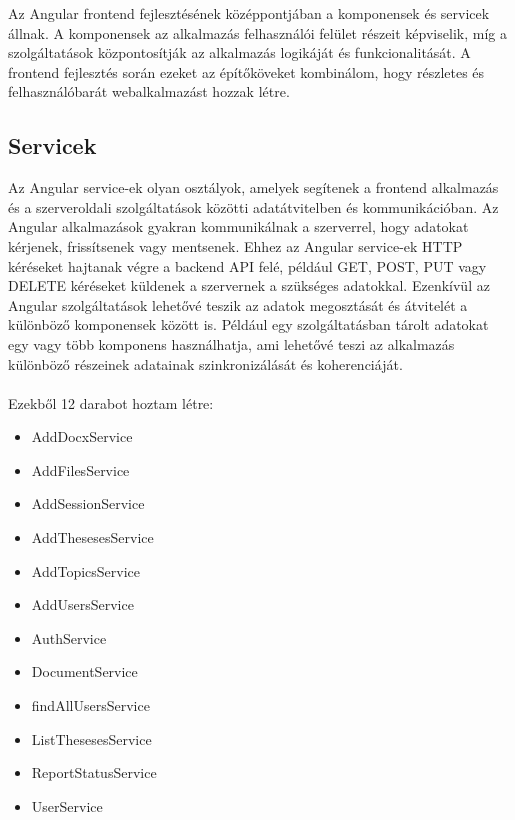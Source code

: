 

Az Angular frontend fejlesztésének középpontjában a komponensek és servicek állnak. A komponensek az alkalmazás felhasználói felület részeit képviselik, míg a szolgáltatások központosítják az alkalmazás logikáját és funkcionalitását. A frontend fejlesztés során ezeket az építőköveket kombinálom, hogy részletes és felhasználóbarát webalkalmazást hozzak létre.


\subsection{Servicek}

Az Angular service-ek olyan osztályok, amelyek segítenek a frontend alkalmazás és a szerveroldali  szolgáltatások közötti adatátvitelben és kommunikációban. Az Angular alkalmazások gyakran kommunikálnak a szerverrel, hogy adatokat kérjenek, frissítsenek vagy mentsenek. Ehhez az Angular service-ek HTTP kéréseket hajtanak végre a backend API felé, például GET, POST, PUT vagy DELETE kéréseket küldenek a szervernek a szükséges adatokkal. Ezenkívül az Angular szolgáltatások lehetővé teszik az adatok megosztását és átvitelét a különböző komponensek között is. Például egy szolgáltatásban tárolt adatokat egy vagy több komponens használhatja, ami lehetővé teszi az alkalmazás különböző részeinek adatainak szinkronizálását és koherenciáját.\\
\\Ezekből 12 darabot hoztam létre:

\begin{itemize}

\item{AddDocxService}
\item{AddFilesService}
\item{AddSessionService}
\item{AddThesesesService}
\item{AddTopicsService}
\item{AddUsersService}
\item{AuthService}
\item{DocumentService}
\item{findAllUsersService}
\item{ListThesesesService}
\item{ReportStatusService}
\item{UserService}

\end{itemize}


